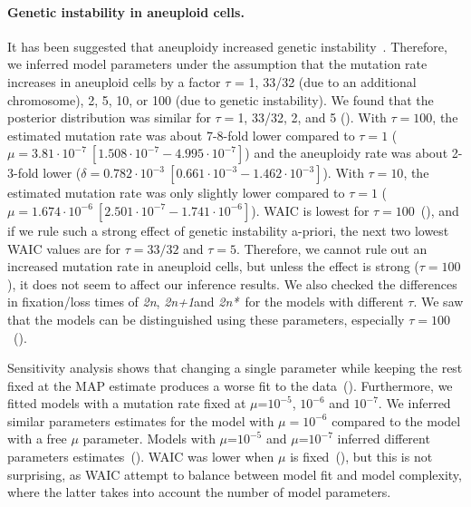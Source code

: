 \documentclass[12pt]{extarticle}
\newcommand{\euwt}{\emph{2n}}
\newcommand{\anwt}{\emph{2n+1}}
\newcommand{\eumt}{\emph{2n*}}
\begin{document}
\paragraph*{Genetic instability in aneuploid cells.}
It has been suggested that aneuploidy increased genetic instability~\citep{Sheltzer2011b}. Therefore, we inferred model parameters under the assumption that the mutation rate increases in aneuploid cells by a factor $\tau$ = 1, 33/32 (due to an additional chromosome), 2, 5, 10, or 100 (due to genetic instability).
We found that the posterior distribution was similar for $\tau=$1, 33/32, 2, and 5 ().
With $\tau=100$, the estimated mutation rate was about 7-8-fold lower compared to $\tau=1$ ($\mu=3.81\cdot10^{-7}\ [1.508\cdot10^{-7}-4.995\cdot10^{-7}]$) and the aneuploidy rate was about 2-3-fold lower ($\delta=0.782\cdot10^{-3}\ [0.661\cdot10^{-3}-1.462\cdot10^{-3}]$). 
With $\tau=10$, the estimated mutation rate was only slightly lower compared to $\tau=1$ ($\mu=1.674\cdot10^{-6}\ [2.501\cdot10^{-7}-1.741\cdot10^{-6}]$). 
WAIC is lowest for $\tau=100$~(), and if we rule such a strong effect of genetic instability a-priori, the next two lowest WAIC values are for $\tau=33/32$ and $\tau=5$.  
Therefore, we cannot rule out an increased mutation rate in aneuploid cells, but unless the effect is strong ($\tau=100$), it does not seem to affect our inference results.
We also checked the differences in fixation/loss times of  \euwt, \anwt and \eumt\  for the models with different $\tau$. We saw that the models can be distinguished using these parameters, especially $\tau=100$~().

Sensitivity analysis shows that changing a single parameter while keeping the rest fixed at the MAP estimate produces a worse fit to the data~().
Furthermore, we fitted models with a mutation rate fixed at $\mu$=$10^{-5}$, $10^{-6}$ and $10^{-7}$. We inferred similar parameters estimates for the model with $\mu=10^{-6}$ compared to the model with a free $\mu$ parameter. Models with $\mu$=$10^{-5}$ and $\mu$=$10^{-7}$ inferred different parameters estimates~().
WAIC was lower when $\mu$ is fixed~(), but this is not surprising, as WAIC attempt to balance between model fit and model complexity, where the latter takes into account the number of model parameters. 
\end{document}
